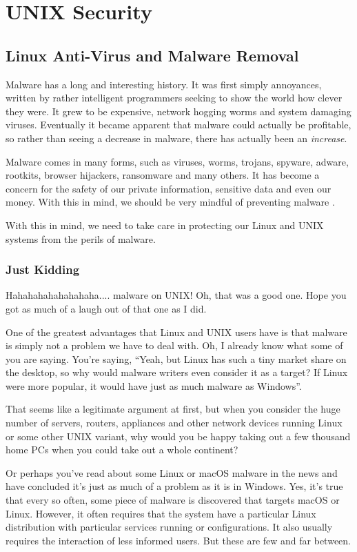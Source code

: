 \chapter{UNIX Security}

\section{Linux Anti-Virus and Malware Removal}

Malware has a long and interesting history.  It was first simply annoyances, written by rather intelligent programmers seeking to show the world how clever they were.  It grew to be expensive, network hogging worms and system damaging viruses.  Eventually it became apparent that malware could actually be profitable, so rather than seeing a decrease in malware, there has actually been an \textit{increase}.

Malware comes in many forms, such as viruses, worms, trojans, spyware, adware, rootkits, browser hijackers, ransomware and many others.  It has become a concern for the safety of our private information, sensitive data and even our money.  With this in mind, we should be very mindful of preventing malware .

With this in mind, we need to take care in protecting our Linux and UNIX systems from the perils of malware.

\subsection{Just Kidding}

Hahahahahahahahaha.... malware on UNIX! Oh, that was a good one.  Hope you got as much of a laugh out of that one as I did.

One of the greatest advantages that Linux and UNIX users have is that malware is simply not a problem we have to deal with.  Oh, I already know what some of you are saying.  You're saying, ``Yeah, but Linux has such a tiny market share on the desktop, so why would malware writers even consider it as a target?  If Linux were more popular, it would have just as much malware as Windows''.

That seems like a legitimate argument at first, but when you consider the huge number of servers, routers, appliances and other network devices running Linux or some other UNIX variant, why would you be happy taking out a few thousand home PCs when you could take out a whole continent?

Or perhaps you've read about some Linux or macOS malware in the news and have concluded it's just as much of a problem as it is in Windows. Yes, it's true that every so often, some piece of malware is discovered that targets macOS or Linux. However, it often requires that the system have a particular Linux distribution with particular services running or configurations. It also usually requires the interaction of less informed users. But these are few and far between. 

